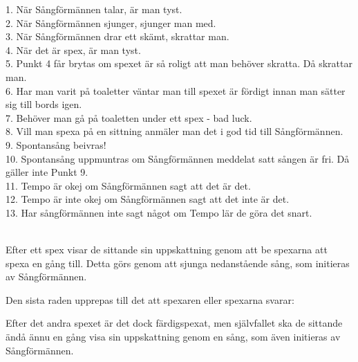 1. När Sångförmännen talar, är man tyst.\\
2. När Sångförmännen sjunger, sjunger man med.\\
3. När Sångförmännen drar ett skämt, skrattar man.\\
4. När det är spex, är man tyst.\\
5. Punkt 4 får brytas om spexet är så roligt att man behöver skratta. Då skrattar man.\\
6. Har man varit på toaletter väntar man till spexet är fördigt innan man sätter sig till bords igen.\\
7. Behöver man gå på toaletten under ett spex - bad luck.\\
8. Vill man spexa på en sittning anmäler man det i god tid till Sångförmännen.\\
9. Spontansång beivras!\\
10. Spontansång uppmuntras om Sångförmännen meddelat satt sången är fri. Då gäller inte Punkt 9.\\
11. Tempo är okej om Sångförmännen sagt att det är det.\\
12. Tempo är inte okej om Sångförmännen sagt att det inte är det.\\
13. Har sångförmännen inte sagt något om Tempo lär de göra det snart.\\
\\


\newpage

Efter ett spex visar de sittande sin uppskattning genom att be spexarna att spexa en gång till.
Detta görs genom att sjunga nedanstående sång, som initieras av Sångförmännen.
\\


Den sista raden upprepas till det att spexaren eller spexarna svarar:
\\


Efter det andra spexet är det dock färdigspexat, men självfallet ska de sittande 
ändå ännu en gång visa sin uppskattning genom en sång, som även initieras av Sångförmännen.
\\

